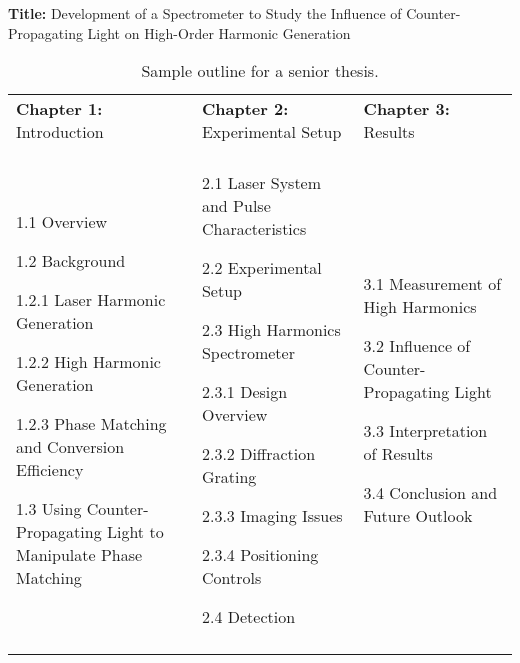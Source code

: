 \begin{table}
 \renewcommand{\baselinestretch}{1}\scriptsize
\textbf{Title:} Development of a Spectrometer to Study the Influence
of Counter-Propagating Light on High-Order Harmonic Generation

\scriptsize
\begin{tabular}{p{1.8in}p{1.8in}p{1.8in}}

  \\
  \textbf{Chapter 1:} Introduction  & \textbf{Chapter 2:} Experimental Setup & \textbf{Chapter 3:} Results \\
  & & \\
  \raggedright

  1.1 Overview

  1.2 Background

  1.2.1 Laser Harmonic Generation

  1.2.2 High Harmonic Generation

  1.2.3 Phase Matching and Conversion Efficiency

  1.3 Using Counter-Propagating Light to Manipulate Phase Matching

  &

  \raggedright

  2.1 Laser System and Pulse Characteristics

  2.2 Experimental Setup

  2.3 High Harmonics Spectrometer

  2.3.1 Design Overview

  2.3.2 Diffraction Grating

  2.3.3 Imaging Issues

  2.3.4 Positioning Controls

  2.4 Detection

  &

  \begin{raggedright}

  3.1 Measurement of High Harmonics

  3.2 Influence of Counter-Propagating Light

  3.3 Interpretation of Results

  3.4 Conclusion and Future Outlook

  \end{raggedright}

  \\ & & \\
\end{tabular}
\renewcommand{\baselinestretch}{1.66}\small\normalsize
\caption{\label{table:outline} Sample outline for a senior thesis.}
\end{table}

